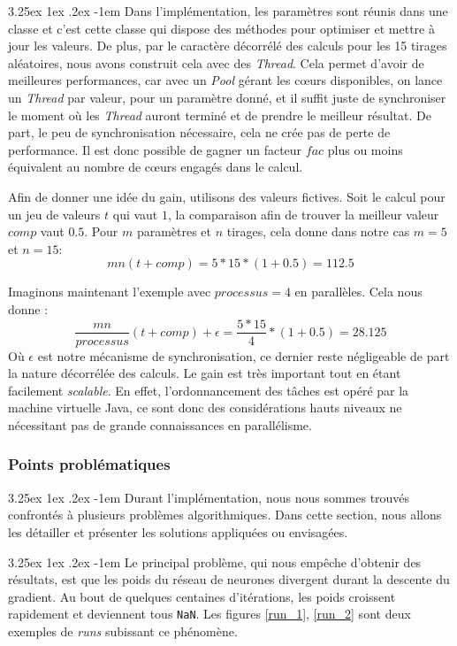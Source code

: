 \documentclass[a4paper, 11pt]{article}
\makeatletter
\renewcommand\paragraph{\@startsection{paragraph}{5}{\z@}%
  {3.25ex \@plus1ex \@minus.2ex}%
  {-1em}%
  {\normalfont\normalsize\bfseries}}
\makeatother
\begin{document}
\paragraph{}
Dans l'implémentation, les paramètres sont réunis dans une classe et c'est cette classe qui dispose des méthodes pour optimiser et mettre à 
jour les valeurs. De plus, par le caractère décorrélé des calculs pour les 15 tirages aléatoires, nous avons construit cela avec des \textit{Thread}. Cela
permet d'avoir de meilleures performances, car avec un \textit{Pool} gérant les cœurs disponibles, on lance un \textit{Thread} par valeur, pour un 
paramètre donné, et il suffit juste de synchroniser le moment
où les \textit{Thread} auront terminé et de prendre le meilleur résultat. De part, le peu de synchronisation nécessaire, cela ne crée pas de perte de
performance. Il est donc possible de gagner un facteur $fac$ plus ou moins équivalent au nombre de cœurs engagés dans le calcul.

Afin de donner une idée du gain, utilisons des valeurs fictives. Soit le calcul pour un jeu de valeurs $t$ qui vaut $1$, la comparaison afin de trouver la meilleur valeur $comp$ vaut $0.5$.
Pour $m$ paramètres et $n$ tirages, cela donne dans notre cas $m=5$ et $n=15$:
$$m n (t + comp) = 5 * 15 * (1 + 0.5) = 112.5$$

Imaginons maintenant l'exemple avec $processus=4$ en parallèles. Cela nous donne :
$$ \frac{m n}{processus} (t + comp) + \epsilon = \frac{5 * 15}{4} * (1 + 0.5) = 28.125$$
Où $\epsilon$ est notre mécanisme de synchronisation, ce dernier reste négligeable de part la nature décorrélée des calculs.
Le gain est très important tout en étant facilement \textit{scalable}. En effet, l'ordonnancement des tâches est opéré par la machine virtuelle Java, ce sont donc des considérations hauts niveaux ne nécessitant pas de grande connaissances en parallélisme.

\subsubsection{Points problématiques}
\paragraph{}
Durant l'implémentation, nous nous sommes trouvés confrontés à plusieurs problèmes algorithmiques. Dans cette section, nous allons les détailler et présenter les solutions appliquées ou envisagées.

\paragraph{}
Le principal problème, qui nous empêche d'obtenir des résultats, est que les poids du réseau de neurones divergent durant la descente du gradient.
Au bout de quelques centaines d'itérations, les poids croissent rapidement et deviennent tous \texttt{NaN}. Les figures \ref{run_1}, \ref{run_2} sont deux exemples de \textit{runs} subissant ce phénomène.
\end{document}
